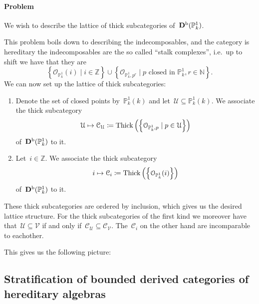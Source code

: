 \documentclass[10pt,a4paper]{article}
\begin{document}
\paragraph{Problem} We wish to describe the lattice of thick subcategories of~$\mathbf{D}^{\mathrm{b}}(\mathbb{P}_k^1)$.

This problem boils down to describing the indecomposables, and the category is hereditary the indecomposables are the so called ``stalk complexes'', i.e.\ up to shift we have that they are
\begin{equation}
  \left\{ \mathcal{O}_{\mathbb{P}_k^1}(i)\mid i\in\mathbb{Z} \right\}\cup\left\{ \mathcal{O}_{\mathbb{P}_k^1,p^r}\mid\text{$p$ closed in $\mathbb{P}_k^1$}, r\in\mathbb{N} \right\}.
\end{equation}
We can now set up the lattice of thick subcategories:
\begin{enumerate}
  \item Denote the set of closed points by~$\mathbb{P}_k^1(k)$ and let~$\mathcal{U}\subseteq\mathbb{P}_k^1(k)$. We associate the thick subcategory
    \begin{equation}
      \mathcal{U}\mapsto\mathcal{C}_{\mathcal{U}}\coloneqq\operatorname{Thick}\left( \left\{ \mathcal{O}_{\mathbb{P}_k^1,p}\mid p\in\mathcal{U} \right\} \right)
    \end{equation}
    of~$\mathbf{D}^{\mathrm{b}}(\mathbb{P}_k^1)$ to it.
  \item Let~$i\in\mathbb{Z}$. We associate the thick subcategory
    \begin{equation}
      i\mapsto\mathcal{C}_i\coloneqq\operatorname{Thick}\left( \left\{ \mathcal{O}_{\mathbb{P}_k^1}(i) \right\} \right)
    \end{equation}
    of~$\mathbf{D}^{\mathrm{b}}(\mathbb{P}_k^1)$ to it.
\end{enumerate}
These thick subcategories are ordered by inclusion, which gives us the desired lattice structure. For the thick subcategories of the first kind we moreover have that~$\mathcal{U}\subseteq\mathcal{V}$ if and only if~$\mathcal{C}_{\mathcal{U}}\subseteq\mathcal{C}_{\mathcal{V}}$. The~$\mathcal{C}_i$ on the other hand are incomparable to eachother.

This gives us the following picture:

\subsection{Stratification of bounded derived categories of hereditary algebras}
\end{document}
